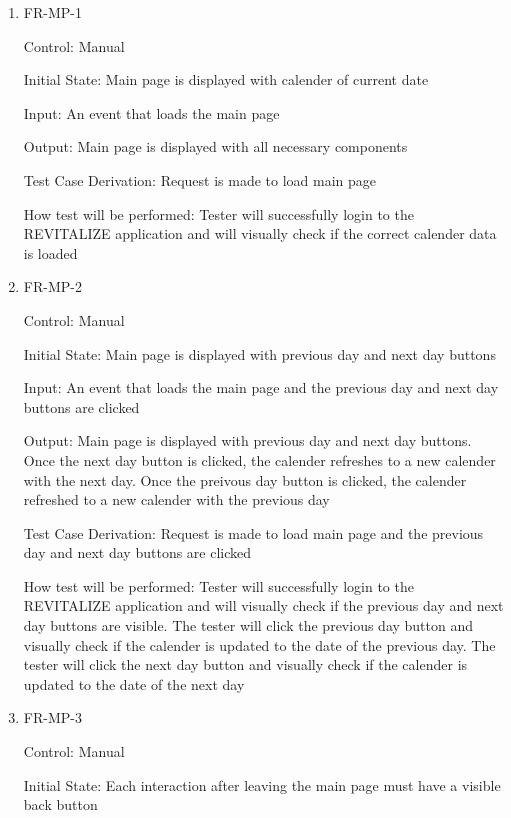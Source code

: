\documentclass[12pt, titlepage]{article}
\begin{document}
\begin{enumerate}

\item{FR-MP-1\\}

Control: Manual
					
Initial State: Main page is displayed with calender of current date
					
Input: An event that loads the main page
					
Output: Main page is displayed with all necessary components

Test Case Derivation: Request is made to load main page

How test will be performed: Tester will successfully login to the REVITALIZE application and will visually check if the correct calender data is loaded
					
\item{FR-MP-2\\}

Control: Manual
					
Initial State: Main page is displayed with previous day and next day buttons
					
Input: An event that loads the main page and the previous day and next day  buttons are clicked
					
Output: Main page is displayed with previous day and next day buttons. Once the next day button is clicked, the calender refreshes to a new calender with the next day. Once the preivous day button is clicked, the calender refreshed to a new calender with the previous day

Test Case Derivation: Request is made to load main page and the previous day and next day buttons are clicked

How test will be performed: Tester will successfully login to the REVITALIZE application and will visually check if the previous day and next day buttons are visible. The tester will click the previous day button and visually check if the calender is updated to the date of the previous day. The tester will click the next day button and visually check if the calender is updated to the date of the next day

\item{FR-MP-3\\}

Control: Manual
					
Initial State: Each interaction after leaving the main page must have a visible back button
					

\end{enumerate}
\end{document}

